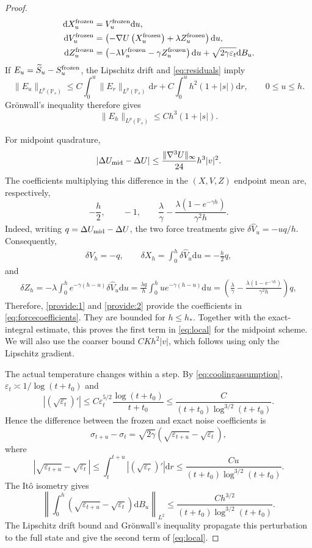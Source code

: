 \documentclass[11pt]{article}
\theoremstyle{definition}
\newcommand{\dd}{\mathrm d}
\newcommand{\eps}{\varepsilon}
\begin{document}
\begin{proof}
\begin{equation}
\begin{aligned}
 \dd X_u^{\rm frozen}&=V_u^{\rm frozen}\dd u,\\
 \dd V_u^{\rm frozen}&=\left(-\nabla U\left(X_u^{\rm frozen}\right)
                      +\lambda Z_u^{\rm frozen}\right)\dd u,\\
 \dd Z_u^{\rm frozen}&=\left(-\lambda V_u^{\rm frozen}
                      -\gamma Z_u^{\rm frozen}\right)\dd u
                      +\sqrt{2\gamma\eps_t}\dd B_u.
\end{aligned}
\end{equation}
If $E_u=\widetilde S_u-S_u^{\rm frozen}$, the
Lipschitz drift and \eqref{eq:residuals} imply
\[
 \|E_u\|_{L^p(\mathbb P_s)}
 \leq C\int_0^u\|E_r\|_{L^p(\mathbb P_s)}\dd r
      +C\int_0^u h^2(1+|s|)\dd r,
 \qquad 0\leq u\leq h.
\]
Gr\"{o}nwall's inequality therefore gives
\[
\|E_h\|_{L^p(\mathbb P_s)}\leq Ch^3(1+|s|).
\]

For midpoint quadrature,
\[
 \left|\Delta U_{\rm mid}-\Delta U\right|
 \leq \frac{\|\nabla^3U\|_\infty}{24}h^3|v|^2.
\]
The coefficients multiplying this difference in the $(X,V,Z)$ endpoint mean
are, respectively, 
\begin{equation}\label{eq:forcecoefficients}
 -\frac h2,\qquad -1,\qquad
 \frac\lambda\gamma-\frac{\lambda(1-e^{-\gamma h})}{\gamma^2h}.
\end{equation}
Indeed, writing $q=\Delta U_{\rm mid}-\Delta U$, the two force treatments
give $\delta\widehat V_u=-uq/h$. Consequently,
\begin{align}\label{provide:1}
 \delta V_h=-q,\qquad
 \delta X_h=\int_0^h\delta\widehat V_u\dd u=-\frac h2q,
\end{align}
and
\begin{align}\label{provide:2}
 \delta Z_h
 =-\lambda\int_0^he^{-\gamma(h-u)}\delta\widehat V_u\dd u
 =\frac{\lambda q}{h}\int_0^hu e^{-\gamma(h-u)}\dd u
 =\left(\frac\lambda\gamma
 -\frac{\lambda(1-e^{-\gamma h})}{\gamma^2h}\right)q,
\end{align}
Therefore, \eqref{provide:1} and \eqref{provide:2} provide the coefficients in \eqref{eq:forcecoefficients}.
They are bounded for $h\leq h_*$. Together with the exact-integral estimate,
this proves the first term in \eqref{eq:local} for the midpoint scheme.
We will also use the
coarser bound $C K h^2|v|$, which follows using only the Lipschitz gradient.

The actual temperature changes within a step. By
\eqref{eq:coolingassumption}, $\eps_t\asymp1/\log(t+t_0)$ and
\[
 |(\sqrt{\eps_t})'|
 \leq C\eps_t^{5/2}\frac{\log(t+t_0)}{t+t_0}
 \leq\frac{C}{(t+t_0)\log^{3/2}(t+t_0)}.
\]
Hence the difference between the frozen and exact noise coefficients is
\[
 \sigma_{t+u}-\sigma_t
 =\sqrt{2\gamma}\left(\sqrt{\eps_{t+u}}-\sqrt{\eps_t}\right),
\]
where
\[
 \left|\sqrt{\eps_{t+u}}-\sqrt{\eps_t}\right|
 \leq\int_t^{t+u}|(\sqrt{\eps_r})'|\dd r
 \leq\frac{Cu}{(t+t_0)\log^{3/2}(t+t_0)}.
\]
The It\^o isometry gives
\[
 \left\|\int_0^h
   \left(\sqrt{\eps_{t+u}}-\sqrt{\eps_t}\right)\dd B_u\right\|_{L^2}
 \leq \frac{C h^{3/2}}{(t+t_0)\log^{3/2}(t+t_0)}.
\]
The Lipschitz drift bound and Gr\"{o}nwall's inequality propagate this perturbation
to the full state and give the second term of \eqref{eq:local}.


\end{proof}
\end{document}
